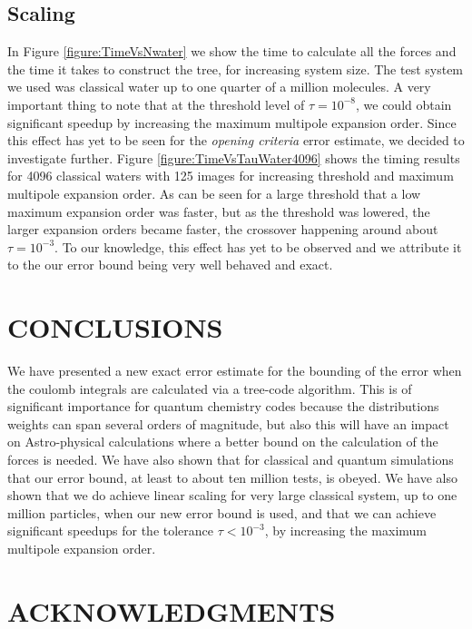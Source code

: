 \documentclass[prb,aps,nobibnotes,superbib,preprint]{revtex4}
\begin{document}
\subsection{Scaling}

In Figure \ref{figure:TimeVsNwater} we show the time to calculate all the forces and the time it takes
to construct the tree, for increasing system size. The test system we used was classical water up to one quarter of a 
million molecules. A very important thing to note that at the  threshold level of $\tau=10^{-8}$, 
we could obtain significant speedup by increasing the maximum multipole expansion order. Since this effect has 
yet to be seen for the {\it opening criteria} error estimate, 
we decided to investigate further. Figure \ref{figure:TimeVsTauWater4096} shows the timing results for 4096 classical waters 
with 125 images for increasing threshold and maximum multipole expansion order. As can be seen for a large threshold that
a low maximum expansion order was faster, but as the threshold was lowered, the larger expansion orders became faster, the
crossover happening around about $\tau=10^{-3}$. To our knowledge, this effect has yet to be observed and we attribute it to
the our error bound being very well behaved and exact. 


\section{CONCLUSIONS}

We have presented a new exact error estimate for the bounding of the error when the coulomb
integrals are calculated via a tree-code algorithm. This is of significant importance 
for quantum chemistry codes because the distributions 
weights can span several orders of magnitude, but also this will have an impact on Astro-physical calculations
where a better bound on the calculation of the forces is needed. We have also shown that for classical and 
quantum simulations that our error bound, at least to about ten million tests, is obeyed. 
We have also shown that we do achieve linear scaling for very large classical system, up to one million particles, 
when our new error bound is used, and that we can achieve significant speedups for the tolerance $\tau < 10^{-3}$, 
by increasing the maximum multipole expansion order. 

\section*{ACKNOWLEDGMENTS}
\end{document}
